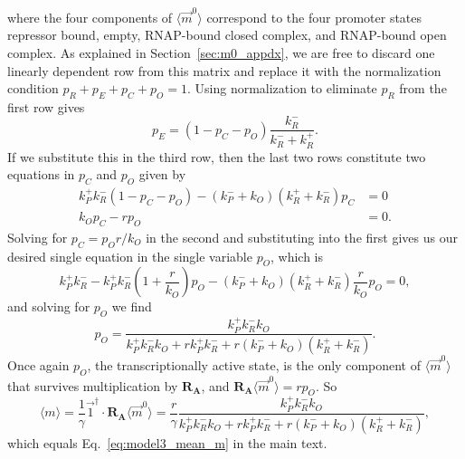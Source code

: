 where the four components of $\langle\vec{m}^0\rangle$ correspond to the four
promoter states repressor bound, empty, RNAP-bound closed complex, and
RNAP-bound open complex. As explained in Section~\ref{sec:m0_appdx}, we are free
to discard one linearly dependent row from this matrix and replace it with the
normalization condition $p_R + p_E + p_C + p_O = 1$. Using normalization to
eliminate $p_R$ from the first row gives
\begin{equation}
p_E = (1 - p_C - p_O)\frac{k_R^-}{k_R^- + k_R^+}.
\end{equation}
If we substitute this in the third row, then the last two rows constitute two
equations in $p_C$ and $p_O$ given by
\begin{align}
k_P^+k_R^-(1-p_C-p_O) - (k_P^- + k_O)(k_R^+ + k_R^-) p_C &= 0
\\
k_O p_C - r p_O &= 0.
\end{align}
Solving for $p_C = p_O r/k_O$ in the second and substituting into the first
gives us our desired single equation in the single variable $p_O$, which is
\begin{equation}
k_P^+k_R^- - k_P^+k_R^-\left(1 + \frac{r}{k_O}\right)p_O
            - (k_P^- + k_O)(k_R^+ + k_R^-) \frac{r}{k_O}p_O = 0,
\end{equation}
and solving for $p_O$ we find
\begin{equation}
p_O = \frac{k_P^+ k_R^- k_O}{k_P^+ k_R^- k_O + r k_P^+ k_R^- +
                            r (k_P^- + k_O) (k_R^+ + k_R^-)}.
\label{eq:model3_pO}
\end{equation}
Once again $p_O$, the transcriptionally active state, is the only component of
$\langle\vec{m}^0\rangle$ that survives multiplication by $\mathbf{R_A}$, and
$\mathbf{R_A}\langle\vec{m}^0\rangle = r p_O$. So
\begin{equation}
\langle{m}\rangle =
    \frac{1}{\gamma}\vec{1}^\dagger\cdot\mathbf{R_A}\langle\vec{m}^0\rangle
= \frac{r}{\gamma}
    \frac{k_P^+ k_R^- k_O}{k_P^+ k_R^- k_O + r k_P^+ k_R^- +
                            r (k_P^- + k_O) (k_R^+ + k_R^-)},
\end{equation}
which equals Eq.~\ref{eq:model3_mean_m} in the main text.

